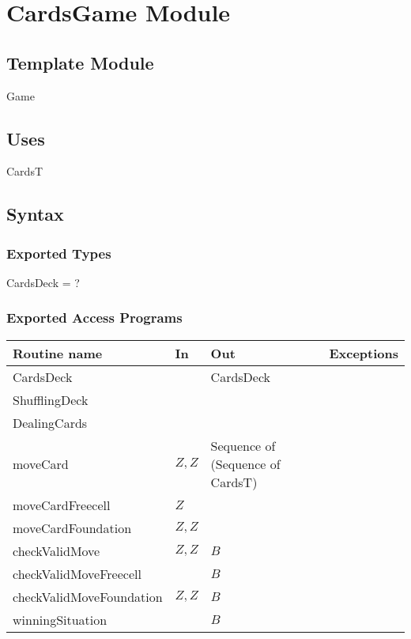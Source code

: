 \documentclass[12pt]{article}
\begin{document}
\newpage

\section* {CardsGame Module}

\subsection*{Template Module}

Game

\subsection* {Uses}

CardsT

\subsection* {Syntax}

\subsubsection* {Exported Types}

CardsDeck = ?

\subsubsection* {Exported Access Programs}

\begin{tabular}{| l | l | l | l |}
	\hline
	\textbf{Routine name} & \textbf{In} & \textbf{Out} & \textbf{Exceptions}\\
	\hline
	CardsDeck &  & CardsDeck & \\
	\hline
	ShufflingDeck & ~ & ~ & ~\\
	\hline
	DealingCards & ~ & ~ & ~\\
	\hline
	moveCard & $\mathit{Z},\mathit{Z}$ & Sequence of (Sequence of CardsT) & ~\\
	\hline
	moveCardFreecell & $\mathit{Z}$ & ~ & ~\\
	\hline
	moveCardFoundation & $\mathit{Z},\mathit{Z}$ & ~ & ~\\
	\hline
	checkValidMove & $\mathit{Z},\mathit{Z}$ & $\mathit{B}$ & ~\\
	\hline
	checkValidMoveFreecell & ~ & $\mathit{B}$ & ~\\
	\hline
	checkValidMoveFoundation & $\mathit{Z},\mathit{Z}$ & $\mathit{B}$ & ~\\
	\hline
	winningSituation & ~ & $\mathit{B}$ & ~\\
	\hline
	
\end{tabular}
\end{document}
